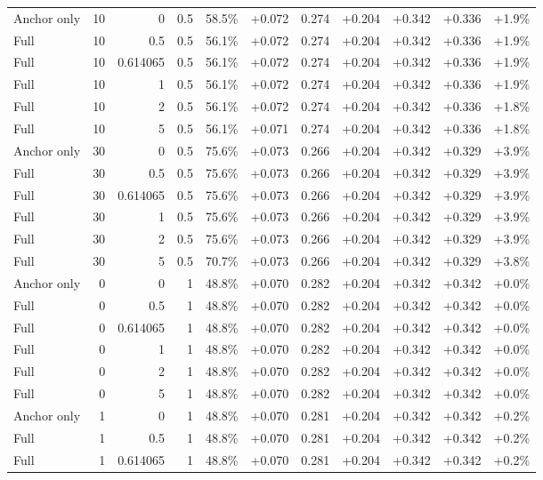 \begin{table}[htbp]
\begin{tabular}{lrrrccccccc}
Anchor only & 10 & 0 & 0.5 & 58.5\% & +0.072 & 0.274 & +0.204 & +0.342 & +0.336 & +1.9\% \\
Full & 10 & 0.5 & 0.5 & 56.1\% & +0.072 & 0.274 & +0.204 & +0.342 & +0.336 & +1.9\% \\
Full & 10 & 0.614065 & 0.5 & 56.1\% & +0.072 & 0.274 & +0.204 & +0.342 & +0.336 & +1.9\% \\
Full & 10 & 1 & 0.5 & 56.1\% & +0.072 & 0.274 & +0.204 & +0.342 & +0.336 & +1.9\% \\
Full & 10 & 2 & 0.5 & 56.1\% & +0.072 & 0.274 & +0.204 & +0.342 & +0.336 & +1.8\% \\
Full & 10 & 5 & 0.5 & 56.1\% & +0.071 & 0.274 & +0.204 & +0.342 & +0.336 & +1.8\% \\
Anchor only & 30 & 0 & 0.5 & 75.6\% & +0.073 & 0.266 & +0.204 & +0.342 & +0.329 & +3.9\% \\
Full & 30 & 0.5 & 0.5 & 75.6\% & +0.073 & 0.266 & +0.204 & +0.342 & +0.329 & +3.9\% \\
Full & 30 & 0.614065 & 0.5 & 75.6\% & +0.073 & 0.266 & +0.204 & +0.342 & +0.329 & +3.9\% \\
Full & 30 & 1 & 0.5 & 75.6\% & +0.073 & 0.266 & +0.204 & +0.342 & +0.329 & +3.9\% \\
Full & 30 & 2 & 0.5 & 75.6\% & +0.073 & 0.266 & +0.204 & +0.342 & +0.329 & +3.9\% \\
Full & 30 & 5 & 0.5 & 70.7\% & +0.073 & 0.266 & +0.204 & +0.342 & +0.329 & +3.8\% \\
Anchor only & 0 & 0 & 1 & 48.8\% & +0.070 & 0.282 & +0.204 & +0.342 & +0.342 & +0.0\% \\
Full & 0 & 0.5 & 1 & 48.8\% & +0.070 & 0.282 & +0.204 & +0.342 & +0.342 & +0.0\% \\
Full & 0 & 0.614065 & 1 & 48.8\% & +0.070 & 0.282 & +0.204 & +0.342 & +0.342 & +0.0\% \\
Full & 0 & 1 & 1 & 48.8\% & +0.070 & 0.282 & +0.204 & +0.342 & +0.342 & +0.0\% \\
Full & 0 & 2 & 1 & 48.8\% & +0.070 & 0.282 & +0.204 & +0.342 & +0.342 & +0.0\% \\
Full & 0 & 5 & 1 & 48.8\% & +0.070 & 0.282 & +0.204 & +0.342 & +0.342 & +0.0\% \\
Anchor only & 1 & 0 & 1 & 48.8\% & +0.070 & 0.281 & +0.204 & +0.342 & +0.342 & +0.2\% \\
Full & 1 & 0.5 & 1 & 48.8\% & +0.070 & 0.281 & +0.204 & +0.342 & +0.342 & +0.2\% \\
Full & 1 & 0.614065 & 1 & 48.8\% & +0.070 & 0.281 & +0.204 & +0.342 & +0.342 & +0.2\% \\

\end{tabular}
\end{table}
